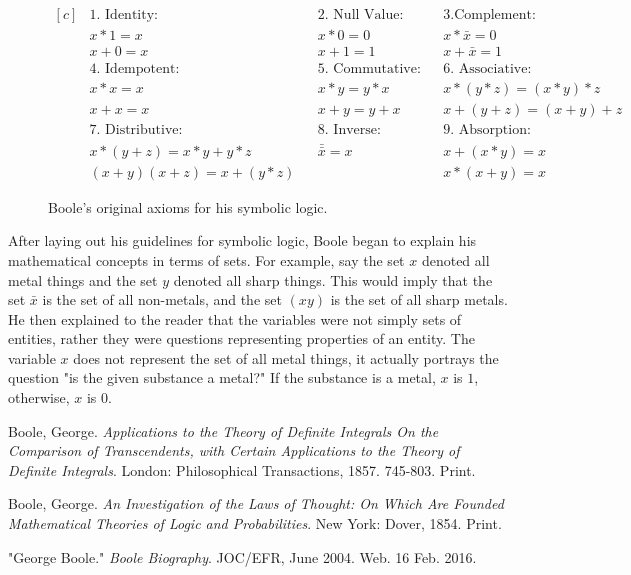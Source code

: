 \documentclass[12]{article} %
\begin{document}
\begin{figure}[H]
\begin{equation*}
\begin{aligned}[c]
&1.\text{ Identity:}		&	&2.\text{ Null Value:}		&	&3.\text{Complement:}\\
&x*1 = x				&	&x*0 = 0				&	&x*\bar{x} = 0\\
&x + 0 = x				&	&x + 1 = 1				&	&x + \bar{x} = 1\\
&4.\text{ Idempotent:}	&	&5.\text{ Commutative:}	&	&6.\text{ Associative:}\\
&x*x = x				&	&x*y = y*x				&	&x*(y*z) = (x*y)*z\\
&x + x = x				&	&x + y = y + x			&	&x+(y+z) = (x+y)+z\\
&7.\text{ Distributive:}	&	&8.\text{ Inverse:}		&	&9.\text{ Absorption:}\\
&x*(y+z) = x*y + y*z		&	&\bar{\bar{x}} = x		&	&x+(x*y) = x\\
&(x+y)(x+z) = x + (y*z)	&	&					&	&x*(x+y) = x
\end{aligned}
\end{equation*}
\caption{Boole's original axioms for his symbolic logic.}\label{fig4}
\end{figure}

After laying out his guidelines for symbolic logic, Boole began to explain his mathematical concepts in terms of sets. For example, say the set $x$ denoted all metal things and the set $y$ denoted all sharp things. This would imply that the set $\bar{x}$ is the set of all non-metals, and the set $(xy)$ is the set of all sharp metals. He then explained to the reader that the variables were not simply sets of entities, rather they were questions representing properties of an entity. The variable $x$ does not represent the set of all metal things, it actually portrays the question "is the given substance a metal?" If the substance is a metal, $x$ is $1$, otherwise, $x$ is $0$. 

\newpage

\begin{thebibliography}{9}
Boole, George. 
\textit{Applications to the Theory of Definite Integrals On the Comparison of Transcendents, with Certain Applications to the Theory of Definite Integrals}. 
London: Philosophical Transactions, 1857. 745-803. Print.
 
Boole, George. 
\textit{An Investigation of the Laws of Thought: On Which Are Founded Mathematical Theories of Logic and Probabilities}.
New York: Dover, 1854. Print.
 
"George Boole."
\textit{Boole Biography}.
JOC/EFR, June 2004. Web. 16 Feb. 2016. 
\end{thebibliography}
\end{document}
